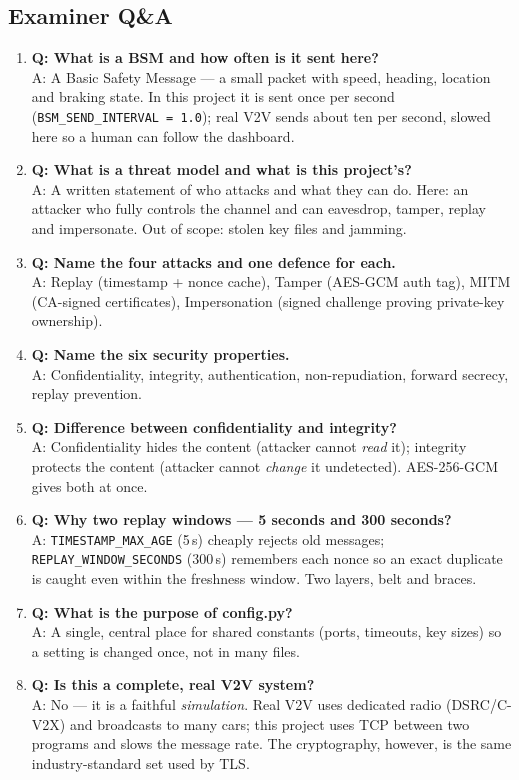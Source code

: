 \documentclass[11pt,a4paper]{report}
\begin{document}
\subsection{Examiner Q\&A}
\begin{enumerate}
  \item \textbf{Q: What is a BSM and how often is it sent here?}\\
        A: A Basic Safety Message --- a small packet with speed, heading,
        location and braking state. In this project it is sent once per second
        (\texttt{BSM\_SEND\_INTERVAL = 1.0}); real V2V sends about ten per
        second, slowed here so a human can follow the dashboard.
  \item \textbf{Q: What is a threat model and what is this project's?}\\
        A: A written statement of who attacks and what they can do. Here: an
        attacker who fully controls the channel and can eavesdrop, tamper,
        replay and impersonate. Out of scope: stolen key files and jamming.
  \item \textbf{Q: Name the four attacks and one defence for each.}\\
        A: Replay (timestamp + nonce cache), Tamper (AES-GCM auth tag), MITM
        (CA-signed certificates), Impersonation (signed challenge proving
        private-key ownership).
  \item \textbf{Q: Name the six security properties.}\\
        A: Confidentiality, integrity, authentication, non-repudiation, forward
        secrecy, replay prevention.
  \item \textbf{Q: Difference between confidentiality and integrity?}\\
        A: Confidentiality hides the content (attacker cannot \emph{read} it);
        integrity protects the content (attacker cannot \emph{change} it
        undetected). AES-256-GCM gives both at once.
  \item \textbf{Q: Why two replay windows --- 5 seconds and 300 seconds?}\\
        A: \texttt{TIMESTAMP\_MAX\_AGE} (5\,s) cheaply rejects old messages;
        \texttt{REPLAY\_WINDOW\_SECONDS} (300\,s) remembers each nonce so an
        exact duplicate is caught even within the freshness window. Two layers,
        belt and braces.
  \item \textbf{Q: What is the purpose of config.py?}\\
        A: A single, central place for shared constants (ports, timeouts, key
        sizes) so a setting is changed once, not in many files.
  \item \textbf{Q: Is this a complete, real V2V system?}\\
        A: No --- it is a faithful \emph{simulation}. Real V2V uses dedicated
        radio (DSRC/C-V2X) and broadcasts to many cars; this project uses TCP
        between two programs and slows the message rate. The cryptography,
        however, is the same industry-standard set used by TLS.
\end{enumerate}
\end{document}
